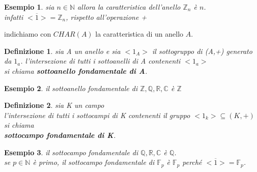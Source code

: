 \documentclass[a4paper,12pt]{article}
\theoremstyle{def}
\newtheorem*{definition}{Definizione}
\theoremstyle{prop}
\theoremstyle{esempio}
\newtheorem*{example}{Esempio}
\theoremstyle{dimostrazione}
\theoremstyle{teo}
\theoremstyle{osservazione}
\begin{document}
\begin{example}
    sia \(n \in \mathbb{N}\) allora la caratteristica dell'anello \(\mathbb{Z}_n\) è \(n\).\\
    infatti \(<\overline{1}> = \mathbb{Z}_n\), rispetto all'operazione +\\
\end{example}

indichiamo con \(CHAR(A)\) la caratteristica di un anello \(A\).\\
\begin{definition}
    sia A un anello e sia \(<1_A>\) il sottogruppo di (A,+) generato da \(1_a\).
    l'intersezione di tutti i sottoanelli di A contenenti \(<1_a>\)\\
    si chiama \textbf{sottoanello fondamentale di A}.\\
\end{definition}

\begin{example}
    il sottoanello fondamentale di \(\mathbb{Z},\mathbb{Q},\mathbb{R},\mathbb{C}\) è \(\mathbb{Z}\)
\end{example}

\begin{definition}
    sia K un campo\\
    l'intersezione di tutti i sottocampi di K contenenti il gruppo \(<1_k> \subseteq (K,+)\) si chiama \\
    \textbf{sottocampo fondamentale di K}.\\
\end{definition}

\begin{example}
    il sottocampo fondamentale di \(\mathbb{Q},\mathbb{R},\mathbb{C}\) è \(\mathbb{Q}\).\\
    se \(p \in \mathbb{N}\) è primo, il sottocampo fondamentale di \(\mathbb{F}_p\) è \(\mathbb{F}_p\) perché \(<\overline{1}> = \mathbb{F}_p\).\\
\end{example}

\newpage
\end{document}
